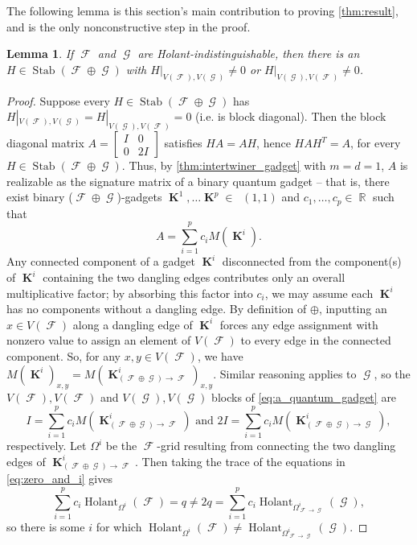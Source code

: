 \documentclass{article}
\newtheorem{lemma}{Lemma}[section]
\theoremstyle{remark}
\theoremstyle{definition}
\DeclareMathOperator{\rr}{\mathbb{R}}
\DeclareMathOperator{\vk}{\mathbf{K}}
\DeclareMathOperator{\fc}{\mathcal{F}}
\DeclareMathOperator{\gc}{\mathcal{G}}
\DeclareMathOperator{\gk}{\mathfrak{G}_{\mathcal{F}}}
\DeclareMathOperator{\stab}{Stab}
\DeclareMathOperator{\holant}{Holant}
\begin{document}
The following lemma is this section's main contribution to proving \autoref{thm:result}, and is the
only nonconstructive step in the proof.
\begin{lemma}
    If $\fc$ and $\gc$ are Holant-indistinguishable, then there is an
    $H \in \stab(\fc \oplus \gc)$ with $H|_{V(\fc),V(\gc)} \neq 0$ or $H|_{V(\gc),V(\fc)} \neq 0$.
    \label{lem:offdiagblock}
\end{lemma}
\begin{proof}
    Suppose every $H \in \stab(\fc \oplus \gc)$ has $H|_{V(\fc),V(\gc)} = H|_{V(\gc),V(\fc)} = 0$
    (i.e. is block diagonal). Then the block diagonal
    matrix $A = \begin{bmatrix} I & 0 \\ 0 & 2I \end{bmatrix}$
    satisfies $H A = A H$, hence $HAH^T = A$, for every $H \in \stab(\fc \oplus \gc)$. Thus,
    by \autoref{thm:intertwiner_gadget} with $m=d=1$, $A$ is realizable as the signature matrix 
    of a binary quantum gadget
    -- that is, there exist binary ($\fc \oplus \gc$)-gadgets $\vk^1, \ldots \vk^p \in \gk(1,1)$ and
    $c_1,\ldots,c_p \in \rr$ such that
    \begin{equation}
        \label{eq:a_quantum_gadget}
        A = \sum_{i=1}^p c_i M(\vk^i).
    \end{equation}
    Any connected component of a gadget $\vk^i$ disconnected from the component(s) of $\vk^i$ containing the
    two dangling edges contributes only an overall multiplicative factor; by absorbing this factor
    into $c_i$, we may assume each $\vk^i$ has no components without a dangling edge. By definition
    of $\oplus$, inputting an
    $x \in V(\fc)$ along a dangling edge of $\vk^i$ forces any edge assignment with nonzero value to 
    assign
    an element of $V(\fc)$ to every edge in the connected component. So, for any $x,y \in V(\fc)$,
    we have $M(\vk^i)_{x,y} = M(\vk^i_{(\fc \oplus \gc) \to \fc})_{x,y}$. 
    Similar reasoning applies to
    $\gc$, so the $V(\fc),V(\fc)$ and $V(\gc),V(\gc)$ blocks of \eqref{eq:a_quantum_gadget} are
    \begin{equation}
        I = \sum_{i=1}^p c_i M(\vk^i_{(\fc \oplus \gc) \to \fc})
        \text{ and }
        2I = \sum_{i=1}^p c_i M(\vk^i_{(\fc \oplus \gc) \to \gc}),
        \label{eq:zero_and_i}
    \end{equation}
    respectively.
    Let $\Omega^i$ be the $\fc$-grid resulting from connecting the two dangling edges of 
    $\vk^i_{(\fc \oplus \gc) \to \fc}$. Then
    taking the trace of the equations in \eqref{eq:zero_and_i} gives
    \[
        \sum_{i=1}^p c_i \holant_{\Omega^i}(\fc) = q \neq 2q = 
        \sum_{i=1}^p c_i \holant_{\Omega^i_{\fc\to\gc}}(\gc),
    \]
    so there is some $i$ for which $\holant_{\Omega^i}(\fc) \neq \holant_{\Omega^i_{\fc\to\gc}}(\gc)$.
\end{proof}
\end{document}
